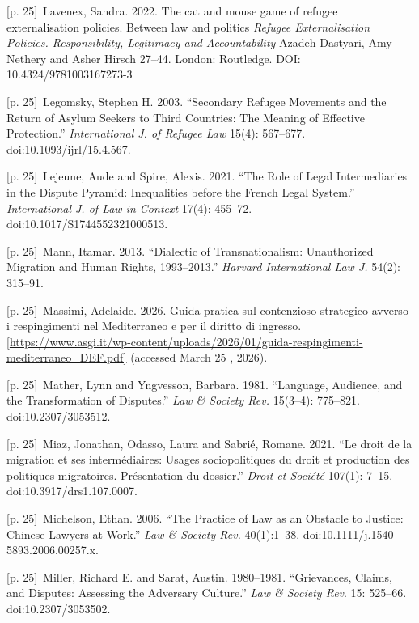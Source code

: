 \documentclass[10pt,a4paper]{article}
\begin{document}
{\scriptsize\color{gray} [p. 25]}\ Lavenex, Sandra. 2022. The cat and mouse game of refugee externalisation policies. Between law and politics \textit{Refugee Externalisation Policies. Responsibility, Legitimacy and Accountability} Azadeh Dastyari, Amy Nethery and Asher Hirsch 27–44. London: Routledge. DOI: 10.4324/9781003167273-3\par
{\scriptsize\color{gray} [p. 25]}\ Legomsky, Stephen H. 2003. “Secondary Refugee Movements and the Return of Asylum Seekers to Third Countries: The Meaning of Effective Protection.” \textit{International J. of Refugee Law} 15(4): 567–677. doi:10.1093/ijrl/15.4.567.\par
{\scriptsize\color{gray} [p. 25]}\ Lejeune, Aude and Spire, Alexis. 2021. “The Role of Legal Intermediaries in the Dispute Pyramid: Inequalities before the French Legal System.” \textit{International J. of Law in Context} 17(4): 455–72. doi:10.1017/S1744552321000513.\par
{\scriptsize\color{gray} [p. 25]}\ Mann, Itamar. 2013. “Dialectic of Transnationalism: Unauthorized Migration and Human Rights, 1993–2013.” \textit{Harvard International Law J.} 54(2): 315–91.\par
{\scriptsize\color{gray} [p. 25]}\ Massimi, Adelaide. 2026. Guida pratica sul contenzioso strategico avverso i respingimenti nel Mediterraneo e per il diritto di ingresso. [\url{https://www.asgi.it/wp-content/uploads/2026/01/guida-respingimenti-mediterraneo_DEF.pdf]} (accessed March 25 , 2026).\par
{\scriptsize\color{gray} [p. 25]}\ Mather, Lynn and Yngvesson, Barbara. 1981. “Language, Audience, and the Transformation of Disputes.” \textit{Law \& Society Rev.} 15(3–4): 775–821. doi:10.2307/3053512.\par
{\scriptsize\color{gray} [p. 25]}\ Miaz, Jonathan, Odasso, Laura and Sabrié, Romane. 2021. “Le droit de la migration et ses intermédiaires: Usages sociopolitiques du droit et production des politiques migratoires. Présentation du dossier.” \textit{Droit et Société} 107(1): 7–15. doi:10.3917/drs1.107.0007.\par
{\scriptsize\color{gray} [p. 25]}\ Michelson, Ethan. 2006. “The Practice of Law as an Obstacle to Justice: Chinese Lawyers at Work.” \textit{Law \& Society Rev.} 40(1):1–38. doi:10.1111/j.1540-5893.2006.00257.x.\par
{\scriptsize\color{gray} [p. 25]}\ Miller, Richard E. and Sarat, Austin. 1980–1981. “Grievances, Claims, and Disputes: Assessing the Adversary Culture.” \textit{Law \& Society Rev}. 15: 525–66. doi:10.2307/3053502.\par
\end{document}
